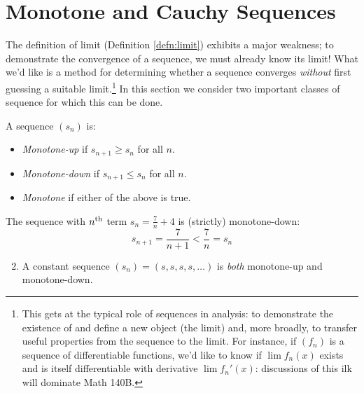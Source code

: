 \clearpage



\section{Monotone and Cauchy Sequences}\label{sec:monocauchy}

The definition of limit (Definition \ref{defn:limit}) exhibits a major weakness; to demonstrate the convergence of a sequence, we must already know its limit! What we'd like is a method for determining whether a sequence converges \emph{without} first guessing a suitable limit.\footnote{This gets at the typical role of sequences in analysis: to demonstrate the existence of and define a new object (the limit) and, more broadly, to transfer useful properties from the sequence to the limit. For instance, if $(f_n)$ is a sequence of differentiable functions, we'd like to know if $\lim f_n(x)$ exists and is itself differentiable with derivative $\lim f_n'(x)$: discussions of this ilk will dominate Math 140B.} In this section we consider two important classes of sequence for which this can be done.

\begin{defn}{}{}
	A sequence $(s_n)$ is:
	\begin{itemize}
	  \item \emph{Monotone-up\footnotemark} if $s_{n+1}\ge s_n$ for all $n$.
		\item \emph{Monotone-down} if $s_{n+1}\le s_n$ for all $n$.
		\item \emph{Monotone} if either of the above is true.
	\end{itemize}
\end{defn}


\begin{examples}{}{}
	\exstart The sequence with $n\textsuperscript{th}$ term $s_n=\frac 7n+4$ is (strictly) monotone-down:
	\[s_{n+1}=\frac 7{n+1}<\frac 7n=s_n\]
	\begin{enumerate}\setcounter{enumi}{1}
	  \item A constant sequence $(s_n)=(s,s,s,s,\ldots)$ is \emph{both} monotone-up and monotone-down.
	\end{enumerate}
\end{examples}


